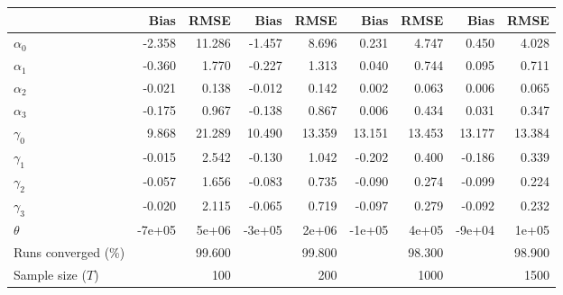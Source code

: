 
\begin{tabular}[t]{lrrrrrrrr}
\toprule
  & Bias & RMSE & Bias & RMSE & Bias & RMSE & Bias & RMSE\\
\midrule
$\alpha_{0}$ & -2.358 & 11.286 & -1.457 & 8.696 & 0.231 & 4.747 & 0.450 & 4.028\\
$\alpha_{1}$ & -0.360 & 1.770 & -0.227 & 1.313 & 0.040 & 0.744 & 0.095 & 0.711\\
$\alpha_{2}$ & -0.021 & 0.138 & -0.012 & 0.142 & 0.002 & 0.063 & 0.006 & 0.065\\
$\alpha_{3}$ & -0.175 & 0.967 & -0.138 & 0.867 & 0.006 & 0.434 & 0.031 & 0.347\\
$\gamma_{0}$ & 9.868 & 21.289 & 10.490 & 13.359 & 13.151 & 13.453 & 13.177 & 13.384\\
$\gamma_{1}$ & -0.015 & 2.542 & -0.130 & 1.042 & -0.202 & 0.400 & -0.186 & 0.339\\
$\gamma_{2}$ & -0.057 & 1.656 & -0.083 & 0.735 & -0.090 & 0.274 & -0.099 & 0.224\\
$\gamma_{3}$ & -0.020 & 2.115 & -0.065 & 0.719 & -0.097 & 0.279 & -0.092 & 0.232\\
$\theta$ & -7e+05 & 5e+06 & -3e+05 & 2e+06 & -1e+05 & 4e+05 & -9e+04 & 1e+05\\
Runs converged (\%) &  & 99.600 &  & 99.800 &  & 98.300 &  & 98.900\\
Sample size ($T$) &  & 100 &  & 200 &  & 1000 &  & 1500\\
\bottomrule
\end{tabular}
